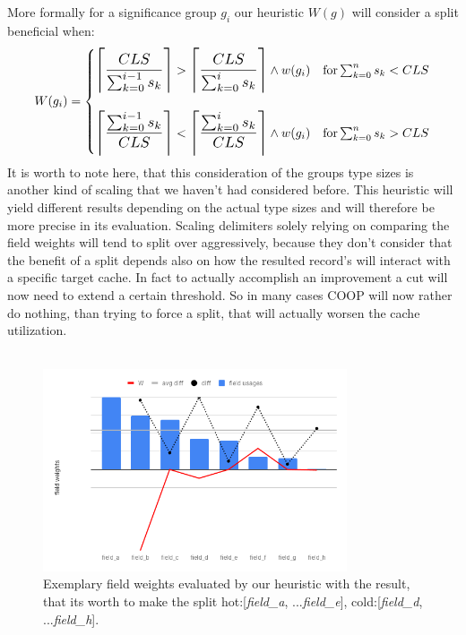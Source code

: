 More formally for a significance group $g_i$ our heuristic $W(g)$ will consider a split beneficial when:
\begin{equation*}
W(g_i) =
\begin{cases}
\scalemath{1.2}{\myceil{\frac{CLS}{\sum_{k=0}^{i-1}s_k}}} > \scalemath{1.2}{\myceil{\frac{CLS}{\sum_{k=0}^{i}s_k}}} \land w(g_i) & \text{for}\sum_{k=0}^{n}s_k < CLS\\\\
\scalemath{1.2}{\myceil{\frac{\sum_{k=0}^{i-1}s_k}{CLS}}} < \scalemath{1.2}{\myceil{\frac{\sum_{k=0}^{i}s_k}{CLS}}} \land w(g_i) & \text{for}\sum_{k=0}^{n}s_k > CLS
\end{cases}
\end{equation*}
It is worth to note here, that this consideration of the groups type sizes is another kind of scaling that we haven't had considered before. This heuristic will yield different results depending on the actual type sizes and will therefore be more precise in its evaluation. Scaling delimiters solely relying on comparing the field weights will tend to split over aggressively, because they don't consider that the benefit of a split depends also on how the resulted record's will interact with a specific target cache. In fact to actually accomplish an improvement a cut will now need to extend a certain threshold. So in many cases COOP will now rather do nothing, than trying to force a split, that will actually worsen the cache utilization.\\\\
\begin{figure}[tbp]
	\centering
	\includegraphics[width=0.8\textwidth,height=0.5\textwidth]{PICs/sig_order_final}
	\caption{Exemplary field weights evaluated by our heuristic with the result, that its worth to make the split hot:[\textit{field\_a}, ...\textit{field\_e}], cold:[\textit{field\_d}, ...\textit{field\_h}].}
	\label{sig_order_final}
\end{figure}
